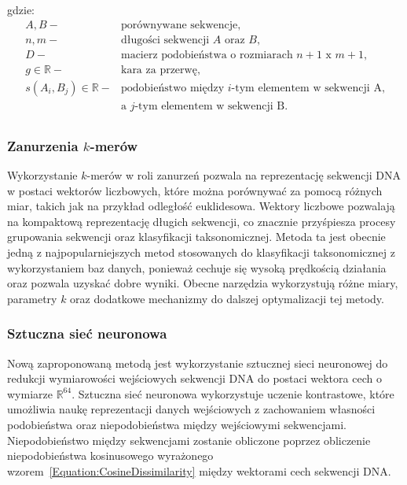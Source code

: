 \documentclass{article}
\begin{document}
{                    gdzie:
                    \begin{align*}
                        A, B -& \text{porównywane sekwencje}, \\
                        n, m -& \text{długości sekwencji } A \text{ oraz } B, \\
                        D -& \text{macierz podobieństwa o rozmiarach } n + 1 \text{ x } m + 1, \\
                        g \in \mathbb{R} -& \text{kara za przerwę}, \\
                        s(A_i, B_j) \in \mathbb{R} -& \text{podobieństwo między } i \text{-tym elementem w sekwencji A,} \\
                        & \text{a } j \text{-tym elementem w sekwencji B}. \\
                    \end{align*}
        
                \subsubsection{Zanurzenia $k$-merów}
        
                    Wykorzystanie $k$-merów w roli zanurzeń pozwala na reprezentację sekwencji DNA w postaci wektorów liczbowych, które można porównywać za pomocą różnych miar, takich jak na przykład odległość euklidesowa. Wektory liczbowe pozwalają na kompaktową reprezentację długich sekwencji, co znacznie przyśpiesza procesy grupowania sekwencji oraz klasyfikacji taksonomicznej. Metoda ta jest obecnie jedną z najpopularniejszych metod stosowanych do klasyfikacji taksonomicznej z wykorzystaniem baz danych, ponieważ cechuje się wysoką prędkością działania oraz pozwala uzyskać dobre wyniki. Obecne narzędzia wykorzystują różne miary, parametry $k$ oraz dodatkowe mechanizmy do dalszej optymalizacji tej metody.

                    \subsubsection{Sztuczna sieć neuronowa}

            Nową zaproponowaną metodą jest wykorzystanie sztucznej sieci neuronowej do redukcji wymiarowości wejściowych sekwencji DNA do postaci wektora cech o wymiarze $\mathbb{R}^{64}$. Sztuczna sieć neuronowa wykorzystuje uczenie kontrastowe, które umożliwia naukę reprezentacji danych wejściowych z zachowaniem własności podobieństwa oraz niepodobieństwa między wejściowymi sekwencjami. Niepodobieństwo między sekwencjami zostanie obliczone poprzez obliczenie niepodobieństwa kosinusowego wyrażonego wzorem~\eqref{Equation:CosineDissimilarity} między wektorami cech sekwencji DNA.

}
\end{document}
